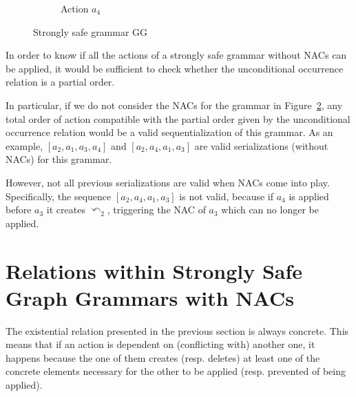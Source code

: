 \begin{example}
\begin{figure}[!ht]
\begin{subfigure}[t]{.2\textwidth}
    \caption{Action $a_4$}\label{fig:process:unconditional-relation:a4}
  \end{subfigure}
  \caption{Strongly safe grammar GG}\label{fig:process:unconditional-relation}
\end{figure}

  In order to know if all the actions of a strongly safe grammar without NACs can be applied, it would be sufficient to check whether the unconditional occurrence relation is a partial order.

  In particular, if we do not consider the NACs for the grammar in Figure~\ref{fig:process:unconditional-relation}, any total order of action compatible with the partial order given by the unconditional occurrence relation would be a valid sequentialization of this grammar. As an example, $[a_2, a_1, a_3, a_4]$ and $[a_2, a_4, a_1, a_3]$ are valid serializations (without NACs) for this grammar. 
  
  However, not all previous serializations are valid when NACs come into play. Specifically, the sequence $[a_2, a_4, a_1, a_3]$ is not valid, because if $a_4$ is applied before $a_3$ it creates $\curvearrowleft_2$, triggering the NAC of $a_3$ which can no longer be applied. 

\end{example}

\section{Relations within Strongly Safe Graph Grammars with NACs}

The existential relation presented in the previous section is always concrete. This means that if an action is dependent on (conflicting with) another one, it happens because the one of them creates (resp. deletes) at least one of the concrete elements necessary for the other to be applied (resp. prevented of being applied).

